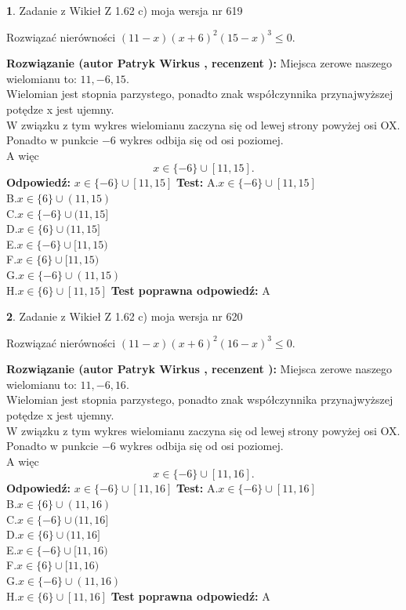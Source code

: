 \documentclass[12pt, a4paper]{article}
\theoremstyle{definition} %
\newtheorem{zad}{}
\newcommand{\zadStart}[1]{\begin{zad}#1\newline}
\newcommand{\zadStop}{\end{zad}}
\newcommand{\rozwStart}[2]{\noindent \textbf{Rozwiązanie (autor #1 , recenzent #2): }\newline}
\newcommand{\rozwStop}{\newline}
\newcommand{\odpStart}{\noindent \textbf{Odpowiedź:}\newline}
\newcommand{\odpStop}{\newline}
\newcommand{\testStart}{\noindent \textbf{Test:}\newline}
\newcommand{\testStop}{\newline}
\newcommand{\kluczStart}{\noindent \textbf{Test poprawna odpowiedź:}\newline}
\newcommand{\kluczStop}{\newline}
\begin{document}
\zadStart{Zadanie z Wikieł Z 1.62 c) moja wersja nr 619}

Rozwiązać nierówności $(11-x)(x+6)^{2}(15-x)^{3}\le0$.
\zadStop
\rozwStart{Patryk Wirkus}{}
Miejsca zerowe naszego wielomianu to: $11, -6, 15$.\\
Wielomian jest stopnia parzystego, ponadto znak współczynnika przy\linebreak najwyższej potędze x jest ujemny.\\ W związku z tym wykres wielomianu zaczyna się od lewej strony powyżej osi OX.\\
Ponadto w punkcie $-6$ wykres odbija się od osi poziomej.\\
A więc $$x \in \{-6\} \cup [11,15].$$
\rozwStop
\odpStart
$x \in \{-6\} \cup [11,15]$
\odpStop
\testStart
A.$x \in \{-6\} \cup [11,15]$\\
B.$x \in \{6\} \cup (11,15)$\\
C.$x \in \{-6\} \cup (11,15]$\\
D.$x \in \{6\} \cup (11,15]$\\
E.$x \in \{-6\} \cup [11,15)$\\
F.$x \in \{6\} \cup [11,15)$\\
G.$x \in \{-6\} \cup (11,15)$\\
H.$x \in \{6\} \cup [11,15]$
\testStop
\kluczStart
A
\kluczStop



\zadStart{Zadanie z Wikieł Z 1.62 c) moja wersja nr 620}

Rozwiązać nierówności $(11-x)(x+6)^{2}(16-x)^{3}\le0$.
\zadStop
\rozwStart{Patryk Wirkus}{}
Miejsca zerowe naszego wielomianu to: $11, -6, 16$.\\
Wielomian jest stopnia parzystego, ponadto znak współczynnika przy\linebreak najwyższej potędze x jest ujemny.\\ W związku z tym wykres wielomianu zaczyna się od lewej strony powyżej osi OX.\\
Ponadto w punkcie $-6$ wykres odbija się od osi poziomej.\\
A więc $$x \in \{-6\} \cup [11,16].$$
\rozwStop
\odpStart
$x \in \{-6\} \cup [11,16]$
\odpStop
\testStart
A.$x \in \{-6\} \cup [11,16]$\\
B.$x \in \{6\} \cup (11,16)$\\
C.$x \in \{-6\} \cup (11,16]$\\
D.$x \in \{6\} \cup (11,16]$\\
E.$x \in \{-6\} \cup [11,16)$\\
F.$x \in \{6\} \cup [11,16)$\\
G.$x \in \{-6\} \cup (11,16)$\\
H.$x \in \{6\} \cup [11,16]$
\testStop
\kluczStart
A
\kluczStop
\end{document}
